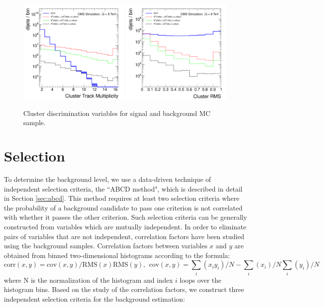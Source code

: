 \begin{enumerate}
\begin{figure}
\centering
\includegraphics[width=0.49\textwidth]{plots/discrimination/disc_clrN.pdf}
\includegraphics[width=0.49\textwidth]{plots/discrimination/disc_clrRMS.pdf}
\caption{Cluster discrimination variables for signal and background MC sample. \label{fig:discclr}}

\end{figure}


\end{enumerate}

\section{Selection}
\label{sec:selection}

To determine the background level, we use a data-driven technique
of independent selection criteria, the ``ABCD method", which is
 described in detail in Section \ref{sec:abcd}. This method requires
at least two selection criteria where the probability of a background candidate to pass one 
criterion is
not correlated with whether it passes the other criterion. Such selection criteria can be generally
constructed
from variables which are mutually independent. 
 In order to eliminate pairs of variables that are not independent,
 correlation factors have been studied using the background samples.  
Correlation factors between variables $x$ and $y$ are obtained from binned two-dimensional histograms 
according to the formula:
\begin{equation}
 \text{corr}(x,y) = \text{cov}(x,y)/\text{RMS}(x)\text{RMS}(y), \hspace{5pt} \text{cov}(x,y)= \sum_i(x_i y_i)/N - \sum_i(x_i)/N \sum_i(y_i)/N
\label{eqn:corr}
\end{equation}
where N is the normalization of the histogram and index $i$ loops over the histogram bins. Based on the study of the correlation factors, we construct
three independent selection criteria for the background estimation:

